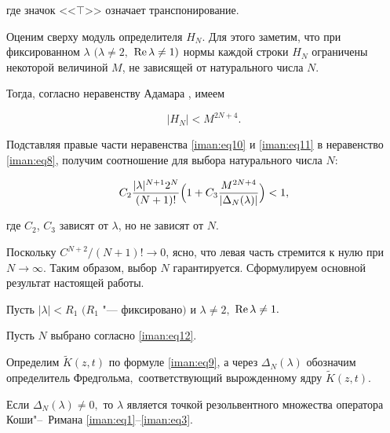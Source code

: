 где значок <<$\top$>>  означает транспонирование.



Оценим сверху модуль определителя $H_N$. Для этого заметим, что при фиксированном $\lambda$ $(\lambda  \ne 2,$ $\mathop{\rm Re}\lambda  \ne 1 )$ нормы каждой строки $H_N$ ограничены некоторой величиной $M$, не зависящей от натурального числа $N$. 

Тогда, согласно неравенству Адамара \cite[стр.~192]{iman:bib14}, имеем

\begin{equation}

\label{iman:eq11}

\left| H_N \right| < M^{2N + 4}.

\end{equation}



Подставляя правые части неравенства \eqref{iman:eq10} и \eqref{iman:eq11} в неравенство \eqref{iman:eq8}, получим соотношение для выбора натурального числа  $N$:

\begin{equation}

\label{iman:eq12}

C_2 \frac{|\lambda |^{N + 1} 2^N }{(N + 1)!}   \Bigl( 1 + C_3 \frac{M^{2N + 4} }{\left| \Delta _N (\lambda ) \right|} \Bigr) < 1,

\end{equation}

где  $C_2$, $C_3$  зависят от  $\lambda$, но не зависят от $N$.



Поскольку ${C^{N + 2} }/{(N + 1)!} \to 0$, ясно, что левая часть стремится к нулю при $N \to \infty $. Таким образом, выбор $N$ гарантируется. Сформулируем основной результат настоящей работы.



\smallskip

\begin{theorem}

Пусть $|\lambda | < R_1$ $(R_1$ "--- фиксировано$)$ и $\lambda  \ne 2,$ $\mathop{\rm Re} \lambda  \ne 1.$ 

Пусть $N$ выбрано согласно {\rm \eqref{iman:eq12}.} 

Определим $\tilde K(z,t)$ по формуле {\rm \eqref{iman:eq9},} а через $\Delta _N (\lambda )$ обозначим определитель Фредгольма$,$ соответствующий вырожденному ядру $\tilde K(z,t).$ 

Если $\Delta _N (\lambda ) \ne 0,$ то $\lambda$ является точкой резольвентного множества оператора Коши"--~Римана \rm \eqref{iman:eq1}--\eqref{iman:eq3}.

\end{theorem}







